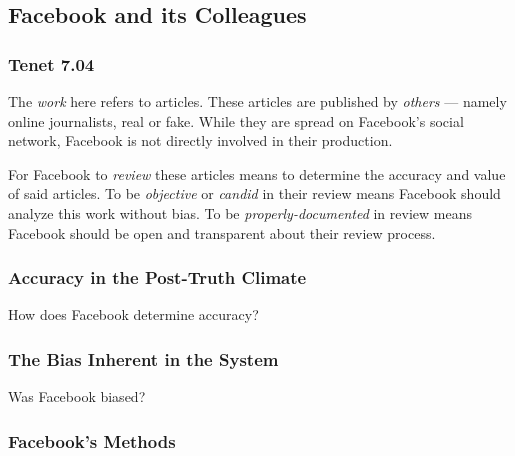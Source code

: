 
\subsection{Facebook and its Colleagues}



\subsubsection{Tenet 7.04}


\par The \emph{work} here refers to articles. These articles are published by \emph{others} --- namely online journalists, real or fake. While they are spread on Facebook's social network, Facebook is not directly involved in their production.

\par For Facebook to \emph{review} these articles means to determine the accuracy and value of said articles. To be \emph{objective} or \emph{candid} in their review means Facebook should analyze this work without bias. To be \emph{properly-documented} in review means Facebook should be open and transparent about their review process. \cite{dictionary}


%
\subsubsection{Accuracy in the Post-Truth Climate}

\par How does Facebook determine accuracy?

%
\subsubsection{The Bias Inherent in the System}

\par Was Facebook biased?

%
\subsubsection{Facebook's Methods}

